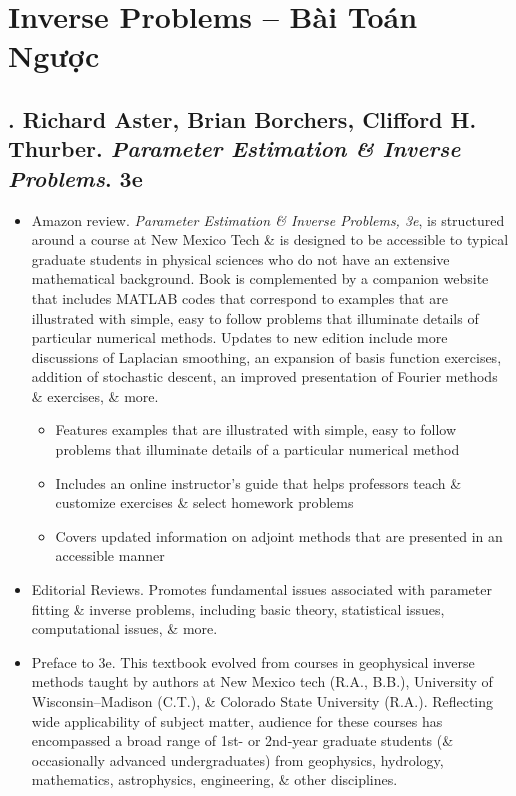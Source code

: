 \documentclass{article}
\begin{document}

\section{Inverse Problems -- Bài Toán Ngược}

\subsection{\cite{Aster_Borchers_Thurber2018}. {\sc Richard Aster, Brian Borchers, Clifford H. Thurber}. {\it Parameter Estimation \& Inverse Problems}. 3e}
{}
\begin{itemize}
	\item {\sf Amazon review.} {\it Parameter Estimation \& Inverse Problems, 3e}, is structured around a course at New Mexico Tech \& is designed to be accessible to typical graduate students in physical sciences who do not have an extensive mathematical background. Book is complemented by a companion website that includes MATLAB codes that correspond to examples that are illustrated with simple, easy to follow problems that illuminate details of particular numerical methods. Updates to new edition include more discussions of Laplacian smoothing, an expansion of basis function exercises, addition of stochastic descent, an improved presentation of Fourier methods \& exercises, \& more.
	\begin{itemize}
		\item Features examples that are illustrated with simple, easy to follow problems that illuminate details of a particular numerical method
		\item Includes an online instructor's guide that helps professors teach \& customize exercises \& select homework problems
		\item Covers updated information on adjoint methods that are presented in an accessible manner
	\end{itemize}
	\item {\sf Editorial Reviews.} Promotes fundamental issues associated with parameter fitting \& inverse problems, including basic theory, statistical issues, computational issues, \& more.
	\item {\sf Preface to 3e.} This textbook evolved from courses in geophysical inverse methods taught by authors at New Mexico tech (R.A., B.B.), University of Wisconsin--Madison (C.T.), \& Colorado State University (R.A.). Reflecting wide applicability of subject matter, audience for these courses has encompassed a broad range of 1st- or 2nd-year graduate students (\& occasionally advanced undergraduates) from geophysics, hydrology, mathematics, astrophysics, engineering, \& other disciplines.
	

\end{itemize}
\end{document}
